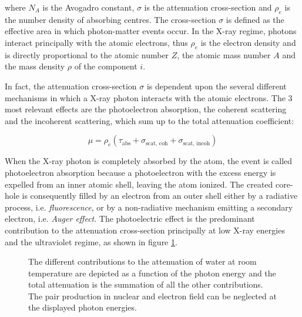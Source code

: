 where $N_A$ is the Avogadro constant, $\sigma$ is the attenuation cross-section and $\rho_e$ is the number density of absorbing centres. The cross-section $\sigma$ is defined as the effective area in which photon-matter events occur. In the X-ray regime, photons interact principally with the atomic electrons, thus $\rho_e$ is the electron density and is directly proportional to the atomic number $Z$, the atomic mass number $A$ and the mass density $\rho$ of the component $i$. 

In fact, the attenuation cross-section $\sigma$ is dependent upon the several different mechanisms in which a X-ray photon interacts with the atomic electrons. The 3 most relevant effects are the photoelectron absorption, the coherent scattering and the incoherent scattering, which sum up to the total attenuation coefficient:

\begin{equation}
        \mu = \rho_e (\tau_{\text{abs}}+\sigma_{\text{scat, coh}}+\sigma_{\text{scat, incoh}})
\end{equation}

When the X-ray photon is completely absorbed by the atom, the event is called photoelectron absorption because a photoelectron with the excess energy is expelled from an inner atomic shell, leaving the atom ionized. The created core-hole is consequently filled by an electron from an outer shell either by a radiative process, i.e. \emph{fluorescence}, or by a non-radiative mechanism emitting a secondary electron, i.e. \emph{Auger effect}. The photoelectric effect is the predominant contribution to the attenuation cross-section principally at low X-ray energies and the ultraviolet regime, as shown in figure \ref{fig:AttenuationWater}. 

\begin{figure}%
	\centering
		
		\caption[Contributions to the X-ray attenuation coefficient of water.]{The different contributions to the attenuation of water at room temperature are depicted as a function of the photon energy \citep{henke_x-ray_1993} and the total attenuation is the summation of all the other contributions. The pair production in nuclear and electron field can be neglected at the displayed photon energies.}
		\label{fig:AttenuationWater}
\end{figure}

